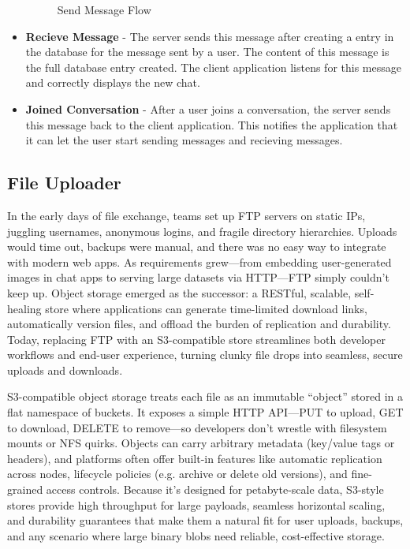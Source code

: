 \begin{itemize}
\begin{figure}[H]
        \caption{Send Message Flow}
        \label{fig:send-message-flow}
    \end{figure}
    \item \textbf{Recieve Message} - The server sends this message after creating a entry in the database for the message sent by a user. The content of this message is the full database entry created. The client application listens for this message and correctly displays the new chat.
    \item \textbf{Joined Conversation} - After a user joins a conversation, the server sends this message back to the client application. This notifies the application that it can let the user start sending messages and recieving messages.
\end{itemize}

\subsection{File Uploader}
In the early days of file exchange, teams set up FTP servers on static IPs, juggling usernames, anonymous logins, and fragile directory hierarchies. Uploads would time out, backups were manual, and there was no easy way to integrate with modern web apps. As requirements grew—from embedding user-generated images in chat apps to serving large datasets via HTTP—FTP simply couldn’t keep up. Object storage emerged as the successor: a RESTful, scalable, self-healing store where applications can generate time-limited download links, automatically version files, and offload the burden of replication and durability. Today, replacing FTP with an S3-compatible store streamlines both developer workflows and end-user experience, turning clunky file drops into seamless, secure uploads and downloads.

S3-compatible object storage treats each file as an immutable “object” stored in a flat namespace of buckets. It exposes a simple HTTP API—PUT to upload, GET to download, DELETE to remove—so developers don’t wrestle with filesystem mounts or NFS quirks. Objects can carry arbitrary metadata (key/value tags or headers), and platforms often offer built-in features like automatic replication across nodes, lifecycle policies (e.g. archive or delete old versions), and fine-grained access controls. Because it’s designed for petabyte-scale data, S3-style stores provide high throughput for large payloads, seamless horizontal scaling, and durability guarantees that make them a natural fit for user uploads, backups, and any scenario where large binary blobs need reliable, cost-effective storage.

